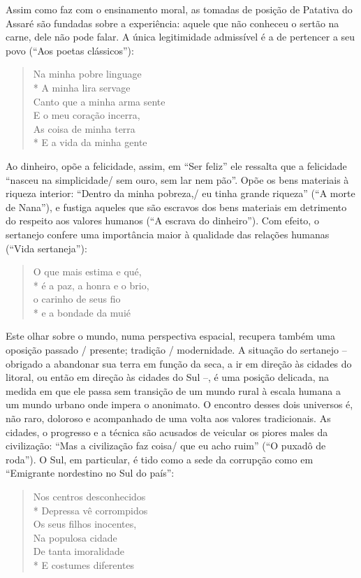 Assim como faz com o ensinamento moral, as tomadas de posição de Patativa do
Assaré são fundadas sobre a experiência: aquele que não conheceu o sertão na
carne, dele não pode falar. A única legitimidade admissível é a de pertencer a
seu povo (“Aos poetas clássicos”):

\begin{verse}
Na minha pobre linguage \\*
A minha lira servage \\
Canto que a minha arma sente \\
E o meu coração incerra, \\
As coisa de minha terra \\*
E a vida da minha gente 
\end{verse}

Ao dinheiro, opõe a felicidade, assim, em “Ser feliz” ele ressalta que a
felicidade “nasceu na simplicidade/ sem ouro, sem lar nem pão”. Opõe os bens
materiais à riqueza interior: “Dentro da minha pobreza,/ eu tinha grande riqueza”
(“A morte de Nana”), e fustiga aqueles que são escravos dos bens materiais em
detrimento do respeito aos valores humanos (“A escrava do dinheiro”). Com
efeito, o sertanejo confere uma importância maior à qualidade das relações
humanas (“Vida sertaneja”): 

\begin{verse}
O que mais estima e qué, \\*
é a paz, a honra e o brio, \\
o carinho de seus fio \\*
e a bondade da muié
\end{verse}

Este olhar sobre o mundo, numa perspectiva espacial, recupera também uma
oposição passado / presente; tradição / modernidade. A situação do sertanejo --
obrigado a abandonar sua terra em função da seca, a ir em direção às cidades do
litoral, ou então em direção às cidades do Sul --, é uma posição delicada, na
medida em que ele passa sem transição de um mundo rural à escala humana a um
mundo urbano onde impera o anonimato. O encontro desses dois universos é, não
raro, doloroso e acompanhado de uma volta aos valores tradicionais. As cidades,
o progresso e a técnica são acusados de veicular os piores males da civilização:
“Mas a civilização faz coisa/ que eu acho ruim” (“O puxadô de roda”). O Sul, em
particular, é tido como a sede da corrupção como em “Emigrante nordestino no Sul
do país”: 

\begin{verse}
Nos centros desconhecidos \\*
Depressa vê corrompidos \\
Os seus filhos inocentes, \\
Na populosa cidade \\
De tanta imoralidade \\*
E costumes diferentes
\end{verse}

